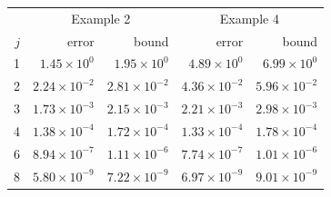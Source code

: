 \begin{tabular}{rrrrr}
\toprule
 & \multicolumn{2}{c}{Example 2} & \multicolumn{2}{c}{Example 4}\\
$j$ & error & bound & error & bound\\
\midrule
1 & $1.45\times10^{0}$ & $1.95\times10^{0}$ & $4.89\times10^{0}$ & $6.99\times10^{0}$\\
2 & $2.24\times10^{-2}$ & $2.81\times10^{-2}$ & $4.36\times10^{-2}$ & $5.96\times10^{-2}$\\
3 & $1.73\times10^{-3}$ & $2.15\times10^{-3}$ & $2.21\times10^{-3}$ & $2.98\times10^{-3}$\\
4 & $1.38\times10^{-4}$ & $1.72\times10^{-4}$ & $1.33\times10^{-4}$ & $1.78\times10^{-4}$\\
6 & $8.94\times10^{-7}$ & $1.11\times10^{-6}$ & $7.74\times10^{-7}$ & $1.01\times10^{-6}$\\
8 & $5.80\times10^{-9}$ & $7.22\times10^{-9}$ & $6.97\times10^{-9}$ & $9.01\times10^{-9}$\\
\bottomrule
\end{tabular}
